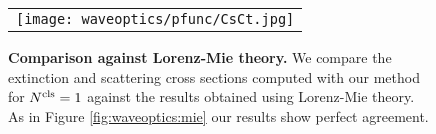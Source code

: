 \begin{figure}[!ht]
    \centering
    \setlength{\resLen}{5in}
    \addtolength{\tabcolsep}{-3pt}
    \begin{tabular}{c}
        \texttt{[image: waveoptics/pfunc/CsCt.jpg]} 
    \end{tabular}
    \caption[Comparison against Lorenz-Mie theory 2]{\label{fig:waveoptics:mie2}
        \textbf{Comparison against Lorenz-Mie theory.} We compare the extinction and scattering cross sections computed with our method for $N^\mathrm{cls}=1$ against the results obtained using Lorenz-Mie theory. As in Figure \ref{fig:waveoptics:mie} our results show perfect agreement. 
	}
\end{figure}
